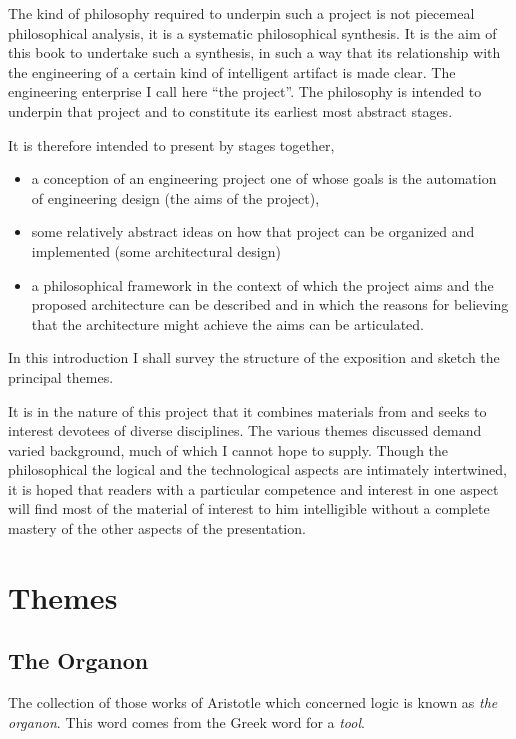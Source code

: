 The kind of philosophy required to underpin such a project is not
piecemeal philosophical analysis, it is a systematic philosophical
synthesis.
It is the aim of this book to undertake such a synthesis, in such a
way that its relationship with the engineering of a certain kind of
intelligent artifact is made clear.
The engineering enterprise I call here ``the project''.
The philosophy is intended to underpin that project and to constitute
its earliest most abstract stages.

It is therefore intended to present by stages together,
\begin{itemize}
\item a conception of an engineering project one of whose goals is the
  automation of engineering design (the aims of the project),
\item some relatively abstract ideas on how that project can be
  organized and implemented (some architectural design)
\item a philosophical framework in the context of which the project
  aims and the proposed architecture can be described and in which the
  reasons for believing that the architecture might achieve the aims
  can be articulated.
\end{itemize}

In this introduction I shall survey the structure of the exposition
and sketch the principal themes.

It is in the nature of this project that it combines materials from
and seeks to interest devotees of diverse disciplines.
The various themes discussed demand varied background, much of which I
cannot hope to supply.
Though the philosophical the logical and the technological aspects are
intimately intertwined, it is hoped that readers with a particular
competence and interest in one aspect will find most of the material
of interest to him intelligible without a complete mastery of the
other aspects of the presentation.

\section{Themes}

\subsection{The Organon}

The collection of those works of Aristotle which concerned logic is
known as \emph{the organon}.
This word comes from the Greek word for a \emph{tool}.

